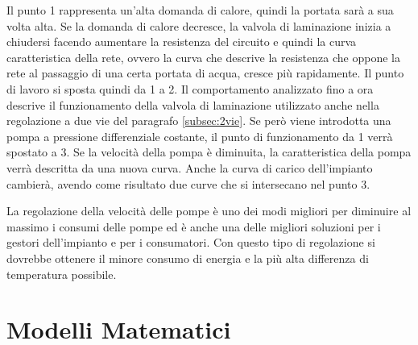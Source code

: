 \documentclass[laurea,oneside,11pt]{USiena_tesiLM3}
\begin{document}
Il punto 1 rappresenta un'alta domanda di calore, quindi la portata sarà a sua volta alta. Se la domanda di calore decresce, la valvola di laminazione inizia a chiudersi facendo aumentare la resistenza del circuito e quindi la curva caratteristica della rete, ovvero la curva che descrive la resistenza che oppone la rete al passaggio di una certa portata di acqua, cresce più rapidamente. Il punto di lavoro si sposta quindi da 1 a 2. Il comportamento analizzato fino a ora descrive il funzionamento della valvola di laminazione utilizzato anche nella regolazione a due vie del paragrafo \ref{subsec:2vie}. Se però viene introdotta una pompa a pressione differenziale costante, il punto di funzionamento da 1 verrà spostato a 3. Se la velocità della pompa è diminuita, la caratteristica della pompa verrà descritta da una nuova curva. Anche la curva di carico dell'impianto cambierà, avendo come risultato due curve che si intersecano nel punto 3.      

La regolazione della velocità delle pompe è uno dei modi migliori per diminuire al massimo i consumi delle pompe ed è anche una delle migliori soluzioni per i gestori dell'impianto e per i consumatori. Con questo tipo di regolazione si dovrebbe ottenere il minore consumo di energia e la più alta differenza di temperatura possibile.

%
%
%


\chapter{Modelli Matematici}
\end{document}
